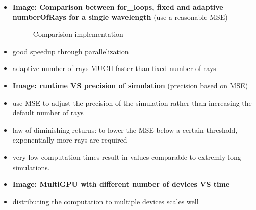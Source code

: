 \begin{itemize}

  \item \textbf{Image: Comparison between for\_loops, fixed and adaptive
    numberOfRays for a single wavelength} (use a reasonable MSE)
    \begin{figure}[H]
      \centerline{
        }
      \caption{Comparision implementation}
      \label{plot:runtime}
    \end{figure}

  \item good speedup through parallelization

  \item adaptive number of rays MUCH faster than fixed number of rays

  \item \textbf{Image: runtime VS precision of simulation} (precision based on
    MSE)

  \item use MSE to adjust the precision of the simulation rather than
    increasing the default number of rays

  \item law of diminishing returns: to lower the MSE below a certain threshold,
    exponentially more rays are required

  \item very low computation times result in values comparable to extremly long
    simulations.

  \item \textbf{Image: MultiGPU with different number of devices VS time}

  \item distributing the computation to multiple devices scales well

\end{itemize}
